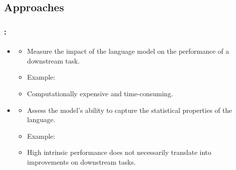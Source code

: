 \documentclass[xcolor=table]{beamer}
\begin{document}
\subsection{Approaches}

\begin{frame}
	\frametitle{\insertshortsubtitle: \insertsection}
	\framesubtitle{\insertsubsection}
	
	\begin{itemize}
		\item {}
		\begin{itemize}
			\item Measure the impact of the language model on the performance of a downstream task.
			\item Example: 
			\item Computationally expensive and time-consuming.
		\end{itemize}
		\item {}
		\begin{itemize}
			\item Assess the model's ability to capture the statistical properties of the language.
			\item Example: 
			\item High intrinsic performance does not necessarily translate into improvements on downstream tasks.
		\end{itemize}
	\end{itemize}
	
\end{frame}

%
%
%	
%			
%
\end{document}
